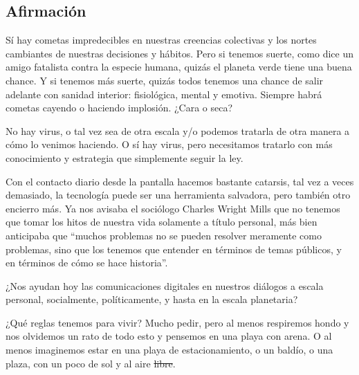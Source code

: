 \subsection{Afirmación}
Sí hay cometas impredecibles en nuestras creencias colectivas y los
nortes cambiantes de nuestras decisiones y hábitos. Pero si tenemos
suerte, como dice un amigo fatalista contra la especie humana, quizás el
planeta verde tiene una buena chance. Y si tenemos más suerte, quizás
todos tenemos una chance de salir adelante con sanidad interior:
fisiológica, mental y emotiva. 
Siempre habrá cometas cayendo o haciendo implosión. ¿Cara o seca?




No hay virus, o tal vez sea de otra escala y/o podemos
tratarla de otra manera a cómo lo venimos haciendo. O sí hay virus, pero
necesitamos tratarlo con más conocimiento y estrategia que simplemente
seguir la ley. 

Con el contacto diario desde la pantalla hacemos bastante catarsis, tal vez a veces demasiado,
la tecnología puede ser una herramienta salvadora, pero también otro encierro más. 
Ya nos avisaba el sociólogo Charles Wright Mills que no tenemos que tomar los hitos de nuestra vida solamente a título personal, 
más bien anticipaba que ``muchos problemas no se pueden resolver meramente como problemas,
sino que los tenemos que entender en términos de temas públicos, y en términos de cómo se hace historia''.

¿Nos ayudan hoy las comunicaciones digitales en nuestros diálogos a escala personal, 
socialmente, políticamente, y hasta en la escala planetaria?

¿Qué reglas tenemos para vivir? Mucho pedir, pero al
menos respiremos hondo y nos olvidemos un rato de todo esto y pensemos
en una playa con arena. O al menos imaginemos estar en una playa de
estacionamiento, o un baldío, o una plaza, con un poco de sol y al aire\sout{ libre}.
